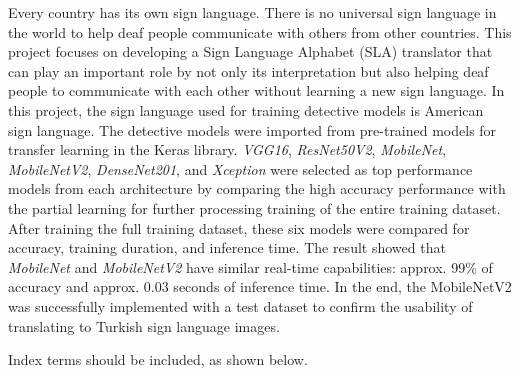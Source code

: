 Every country has its own sign language. There is no universal sign language in the world to help deaf people communicate with others from other countries. This project focuses on developing a Sign Language Alphabet (SLA) translator that can play an important role by not only its interpretation but also helping deaf people to communicate with each other without learning a new sign language. In this project, the sign language used for training detective models is American sign language. The detective models were imported from pre-trained models for transfer learning in the Keras library. \textit{VGG16}, \textit{ResNet50V2}, \textit{MobileNet}, \textit{MobileNetV2}, \textit{DenseNet201}, and \textit{Xception} were selected as top performance models from each architecture by comparing the high accuracy performance with the partial learning for further processing training of the entire training dataset. After training the full training dataset, these six models were compared for accuracy, training duration, and inference time. The result showed that \textit{MobileNet} and \textit{MobileNetV2} have similar real-time capabilities: approx. 99\% of accuracy and approx. 0.03 seconds of inference time. In the end, the MobileNetV2 was successfully implemented with a test dataset to confirm the usability of translating to Turkish sign language images.

  Index terms should be included, as shown below.